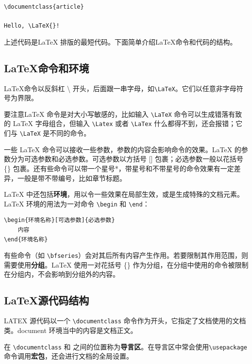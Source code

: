 \begin{lstlisting}
\documentclass{article}

Hello, \LaTeX{}!

\end{lstlisting}

上述代码是\LaTeX{} 排版的最短代码。下面简单介绍\LaTeX{}命令和代码的结构。

\subsection{\LaTeX{}命令和环境}\label{subsec:latexcommands}

\LaTeX{}命令以反斜杠 \hspace{0.2em}\textbackslash\hspace{0.2em} 开头，后面跟一串字母，如\lstinline{\LaTeX}。它们以任意非字母符号为界限。

要注意\LaTeX{} 命令是对大小写敏感的，比如输入 \lstinline{\LaTeX} 命令可以生成错落有致的 \LaTeX{} 字母组合，但输入 \lstinline{\Latex} 或者 \lstinline{\LaTex} 什么都得不到，还会报错；它们与 \lstinline{\LaTeX} 是不同的命令。

一些 \LaTeX{} 命令可以接收一些参数，参数的内容会影响命令的效果。\LaTeX{} 的参数分为可选参数和必选参数。可选参数以方括号 [] 包裹；必选参数一般以花括号 \{\} 包裹。还有些命令可以带一个星号*，带星号和不带星号的命令效果有一定差异，一般是带不带编号，比如章节标题。

\LaTeX{} 中还包括{\bf 环境}，用以令一些效果在局部生效，或是生成特殊的文档元素。\LaTeX{} 环境的用法为一对命令 \lstinline{\begin} 和 \lstinline{\end}：
\begin{lstlisting}
\begin{环境名称}[可选参数]{必选参数}
    内容
\end{环境名称}
\end{lstlisting}

有些命令（如 \lstinline{\bfseries}）会对其后所有内容产生作用。若要限制其作用范围，则需要使用{\bf 分组}。\LaTeX{} 使用一对花括号
\{\} 作为分组，在分组中使用的命令被限制在分组内，不会影响到分组外的内容。

\subsection{\LaTeX{}源代码结构}\label{subsec:latexsourcestructure}
LATEX 源代码以一个 \lstinline{\documentclass} 命令作为开头，它指定了文档使用的文档类。document 环境当中的内容是文档正文。

在 \lstinline{\documentclass} 和 \lstinline||之间的位置称为{\bf 导言区}。在导言区中常会使用\lstinline{\usepackage} 命令调用{\bf 宏包}，还会进行文档的全局设置。

